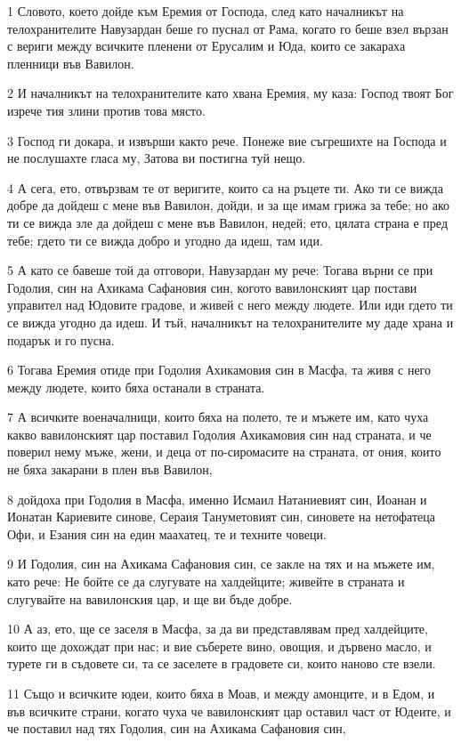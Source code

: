 \par 1 Словото, което дойде към Еремия от Господа, след като началникът на телохранителите Навузардан беше го пуснал от Рама, когато го беше взел вързан с вериги между всичките пленени от Ерусалим и Юда, които се закараха пленници във Вавилон.
\par 2 И началникът на телохранителите като хвана Еремия, му каза: Господ твоят Бог изрече тия злини против това място.
\par 3 Господ ги докара, и извърши както рече. Понеже вие съгрешихте на Господа и не послушахте гласа му, Затова ви постигна туй нещо.
\par 4 А сега, ето, отвързвам те от веригите, които са на ръцете ти. Ако ти се вижда добре да дойдеш с мене във Вавилон, дойди, и за ще имам грижа за тебе; но ако ти се вижда зле да дойдеш с мене във Вавилон, недей; ето, цялата страна е пред тебе; гдето ти се вижда добро и угодно да идеш, там иди.
\par 5 А като се бавеше той да отговори, Навузардан му рече: Тогава върни се при Годолия, син на Ахикама Сафановия син, когото вавилонският цар постави управител над Юдовите градове, и живей с него между людете. Или иди гдето ти се вижда угодно да идеш. И тъй, началникът на телохранителите му даде храна и подарък и го пусна.
\par 6 Тогава Еремия отиде при Годолия Ахикамовия син в Масфа, та живя с него между людете, които бяха останали в страната.
\par 7 А всичките военачалници, които бяха на полето, те и мъжете им, като чуха какво вавилонският цар поставил Годолия Ахикамовия син над страната, и че поверил нему мъже, жени, и деца от по-сиромасите на страната, от ония, които не бяха закарани в плен във Вавилон,
\par 8 дойдоха при Годолия в Масфа, именно Исмаил Натаниевият син, Иоанан и Ионатан Кариевите синове, Сераия Тануметовият син, синовете на нетофатеца Офи, и Езания син на един маахатец, те и техните човеци.
\par 9 И Годолия, син на Ахикама Сафановия син, се закле на тях и на мъжете им, като рече: Не бойте се да слугувате на халдейците; живейте в страната и слугувайте на вавилонския цар, и ще ви бъде добре.
\par 10 А аз, ето, ще се заселя в Масфа, за да ви представлявам пред халдейците, които ще дохождат при нас; и вие съберете вино, овощия, и дървено масло, и турете ги в съдовете си, та се заселете в градовете си, които наново сте взели.
\par 11 Също и всичките юдеи, които бяха в Моав, и между амонците, и в Едом, и във всичките страни, когато чуха че вавилонският цар оставил част от Юдеите, и че поставил над тях Годолия, син на Ахикама Сафановия син,
